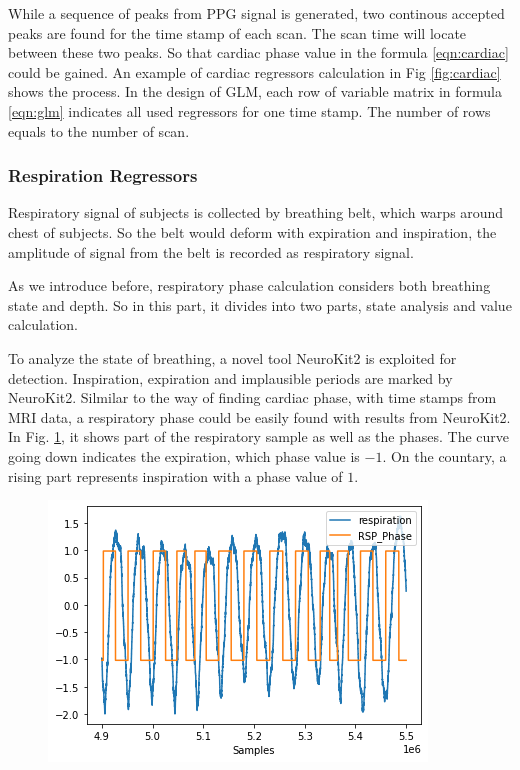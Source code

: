 While a sequence of peaks from PPG signal is generated, 
two continous accepted peaks are found for the time stamp of each scan.
The scan time will locate between these two peaks. 
So that cardiac phase value in the formula \ref{eqn:cardiac} could be gained. An example of 
cardiac regressors calculation in Fig \ref{fig:cardiac} shows the process. 
In the design of GLM, each row of variable matrix in formula \ref{eqn:glm} indicates all used regressors
for one time stamp. The number of rows equals to the number of scan.

\subsubsection{Respiration Regressors}

Respiratory signal of subjects is collected by breathing belt, which warps around chest of subjects. 
So the belt would deform with expiration and inspiration, the amplitude of signal from the 
belt is recorded as respiratory signal. 

As we introduce before, respiratory phase calculation considers both breathing state and depth.
So in this part, it divides into two parts, state analysis and value calculation.

To analyze the state of breathing, a novel tool NeuroKit2\cite{Makowski2021neurokit} is exploited 
for detection. Inspiration, expiration and implausible periods are marked by NeuroKit2. 
Silmilar to the way of finding cardiac phase, with time stamps from MRI data, a respiratory phase
could be easily found with results from NeuroKit2. In Fig. \ref{fig:rsp_phase}, it shows part of the 
respiratory sample as well as the phases. The curve going down indicates the expiration, which 
phase value is $-1$. On the countary, a rising part represents inspiration with a phase value of $1$. 

\begin{figure}[htp]
    \centering
    \includegraphics[width=\columnwidth]{Figures/rsp_phase.png}
    \caption{}
    \label{fig:rsp_phase}
\end{figure} 

